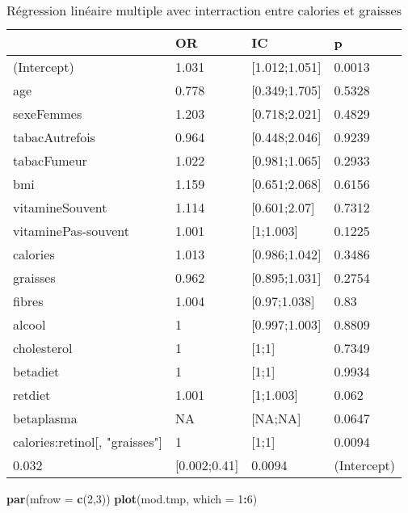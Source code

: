 \documentclass[]{article}
\newenvironment{Shaded}{\begin{snugshade}}{\end{snugshade}}
\newcommand{\KeywordTok}[1]{\textcolor[rgb]{0.13,0.29,0.53}{\textbf{#1}}}
\newcommand{\DataTypeTok}[1]{\textcolor[rgb]{0.13,0.29,0.53}{#1}}
\newcommand{\DecValTok}[1]{\textcolor[rgb]{0.00,0.00,0.81}{#1}}
\newcommand{\OperatorTok}[1]{\textcolor[rgb]{0.81,0.36,0.00}{\textbf{#1}}}
\newcommand{\NormalTok}[1]{#1}
\begin{document}
\begin{table}

\caption{\label{tab:unnamed-chunk-88}Régression linéaire multiple avec interraction entre calories et graisses}
\centering
\begin{tabular}[t]{l|l|l|l}
\hline
  & OR & IC & p\\
\hline
\rowcolor[HTML]{BBD2E1}  (Intercept) & 1.031 & [1.012;1.051] & 0.0013\\
\hline
age & 0.778 & [0.349;1.705] & 0.5328\\
\hline
\rowcolor[HTML]{BBD2E1}  sexeFemmes & 1.203 & [0.718;2.021] & 0.4829\\
\hline
tabacAutrefois & 0.964 & [0.448;2.046] & 0.9239\\
\hline
\rowcolor[HTML]{BBD2E1}  tabacFumeur & 1.022 & [0.981;1.065] & 0.2933\\
\hline
bmi & 1.159 & [0.651;2.068] & 0.6156\\
\hline
\rowcolor[HTML]{BBD2E1}  vitamineSouvent & 1.114 & [0.601;2.07] & 0.7312\\
\hline
vitaminePas-souvent & 1.001 & [1;1.003] & 0.1225\\
\hline
\rowcolor[HTML]{BBD2E1}  calories & 1.013 & [0.986;1.042] & 0.3486\\
\hline
graisses & 0.962 & [0.895;1.031] & 0.2754\\
\hline
\rowcolor[HTML]{BBD2E1}  fibres & 1.004 & [0.97;1.038] & 0.83\\
\hline
alcool & 1 & [0.997;1.003] & 0.8809\\
\hline
\rowcolor[HTML]{BBD2E1}  cholesterol & 1 & [1;1] & 0.7349\\
\hline
betadiet & 1 & [1;1] & 0.9934\\
\hline
\rowcolor[HTML]{BBD2E1}  retdiet & 1.001 & [1;1.003] & 0.062\\
\hline
betaplasma & NA & [NA;NA] & 0.0647\\
\hline
\rowcolor[HTML]{BBD2E1}  calories:retinol[, "graisses"] & 1 & [1;1] & 0.0094\\
\hline
0.032 & [0.002;0.41] & 0.0094 & (Intercept)\\
\hline
\end{tabular}
\end{table}

\begin{Shaded}
\begin{Highlighting}[]
\KeywordTok{par}\NormalTok{(}\DataTypeTok{mfrow =} \KeywordTok{c}\NormalTok{(}\DecValTok{2}\NormalTok{,}\DecValTok{3}\NormalTok{))}
\KeywordTok{plot}\NormalTok{(mod.tmp, }\DataTypeTok{which =} \DecValTok{1}\OperatorTok{:}\DecValTok{6}\NormalTok{)}
\end{Highlighting}
\end{Shaded}
\end{document}
